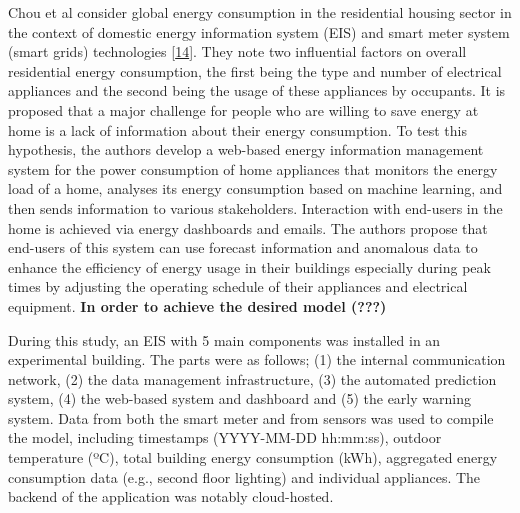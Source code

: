 \documentclass[11pt,]{article}
\begin{document}
Chou et al consider global energy consumption in the residential housing
sector in the context of domestic energy information system (EIS) and
smart meter system (smart grids) technologies
{[}\protect\hyperlink{ref-jui-shengchouCloudForecastingSystem2019}{14}{]}.
They note two influential factors on overall residential energy
consumption, the first being the type and number of electrical
appliances and the second being the usage of these appliances by
occupants. It is proposed that a major challenge for people who are
willing to save energy at home is a lack of information about their
energy consumption. To test this hypothesis, the authors develop a
web-based energy information management system for the power consumption
of home appliances that monitors the energy load of a home, analyses its
energy consumption based on machine learning, and then sends information
to various stakeholders. Interaction with end-users in the home is
achieved via energy dashboards and emails. The authors propose that
end-users of this system can use forecast information and anomalous data
to enhance the efficiency of energy usage in their buildings especially
during peak times by adjusting the operating schedule of their
appliances and electrical equipment. \textbf{In order to achieve the
desired model (???)}

During this study, an EIS with 5 main components was installed in an
experimental building. The parts were as follows; (1) the internal
communication network, (2) the data management infrastructure, (3) the
automated prediction system, (4) the web-based system and dashboard and
(5) the early warning system. Data from both the smart meter and from
sensors was used to compile the model, including timestamps (YYYY-MM-DD
hh:mm:ss), outdoor temperature (ºC), total building energy consumption
(kWh), aggregated energy consumption data (e.g., second floor lighting)
and individual appliances. The backend of the application was notably
cloud-hosted.
\end{document}
